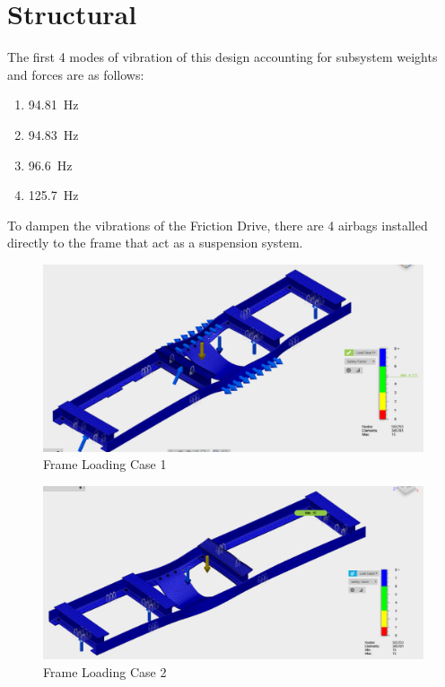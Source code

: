 \documentclass[main.tex]{subfiles}
\begin{document}
    \section{Structural}
    The first 4 modes of vibration of this design accounting for subsystem weights and forces are as follows:
    \begin{enumerate}
        \item \SI{94.81}{Hz}
        \item \SI{94.83}{Hz}
        \item \SI{96.6}{Hz}
        \item \SI{125.7}{Hz}
    \end{enumerate}
    To dampen the vibrations of the Friction Drive, there are 4 airbags installed directly to the frame that act as a suspension system.\\
    \begin{figure}
        \centering
        \includegraphics[width=\linewidth]{images/frame1}
        \caption{Frame Loading Case 1}
        \label{fig:frame1}
    \end{figure}
    \begin{figure}
        \centering
        \includegraphics[width=\linewidth]{images/frame2}
        \caption{Frame Loading Case 2}
        \label{fig:frame2}
    \end{figure}
\end{document}
